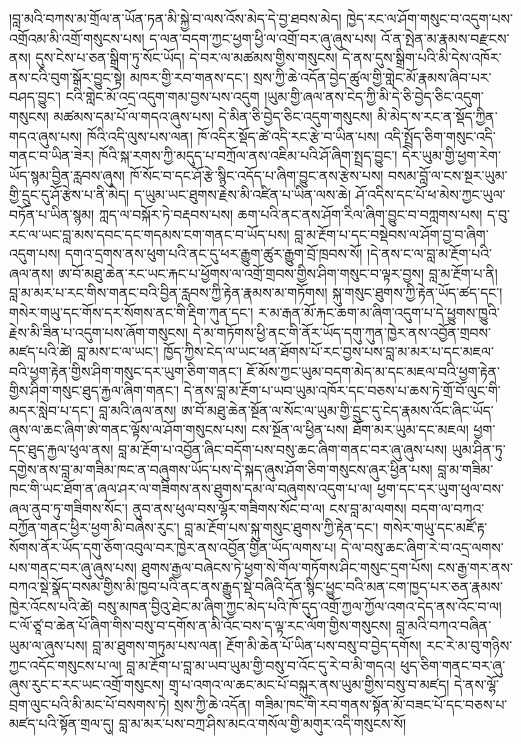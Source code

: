 \documentclass{article}
\begin{document}
།བླ་མའི་བཀས་མ་གྲོལ་ན་ཡོན་ཏན་མི་སྐྱེ་བ་ལས་འོས་མེད་དེ་བྱ་ཐབས་མེད། ཁྱེད་རང་ལ་ཤོག་གསུང་བ་འདུག་པས་འགྲོའམ་མི་འགྲོ་གསུངས་པས། ད་ལན་བདག་ཀྱང་ཕྱག་ཕྱི་ལ་འགྲོ་བར་ཞུ་ཞུས་པས། འོ་ན་སྤེན་མ་རྣམས་བརྫངས་ནས། དུས་ངེས་པ་ཅན་སྒྲིག་ཏུ་སོང་ཡོད། དེ་བར་ལ་མཚམས་གྱིས་གསུངས། དེ་ནས་དུས་སྒྲིག་པའི་མི་དེས་འཁོར་ནས་ངའི་བུག་སྒོར་བྱུང་སྟེ། མཁར་གྱི་རབ་གནས་དང་། སྲས་ཀྱི་ཆེ་འདོན་བྱེད་ཚུལ་གྱི་གླེང་མོ་རྣམས་ཞིབ་པར་བཤད་བྱུང་། ངའི་གླེང་མོ་འདྲ་འདུག་གམ་བྱས་པས་འདུག །ཡུམ་གྱི་ཞལ་ནས་ངེད་ཀྱི་མི་དེ་ཅི་བྱེད་ཅིང་འདུག་གསུངས། མཚམས་དམ་པོ་ལ་གདའ་ཞུས་པས། དེ་མིན་ཅི་བྱེད་ཅིང་འདུག་གསུངས། མི་མེད་ས་རང་ན་སྡོད་ཀྱིན་གདའ་ཞུས་པས། ཁོའི་འདི་ལུས་པས་ལན། ཁོ་འདིར་སྡོད་ཚེ་འདི་རང་རྩེ་བ་ཡིན་པས། འདི་སྤྲོད་ཅིག་གསུང་འདི་གནང་བ་ཡིན་ཟེར། ཁོའི་སྐ་རགས་ཀྱི་མདུད་པ་བཀྲོལ་ནས་འཇིམ་པའི་ཤོ་ཞིག་སྤྲད་བྱུང་། དེར་ཡུམ་གྱི་ཕྱག་རེག་ཡོད་སྙམ་བྱིན་རླབས་ཞུས། ཁོ་སོང་བ་དང་ཤོ་རྩེ་སྙིང་འདོད་པ་ཞིག་བྱུང་ནས་རྩེས་པས། བསམ་བློ་ལ་ངས་སྔར་ཡུམ་གྱི་དྲུང་དུ་ཤོ་རྩེས་པ་ནི་མེད། ད་ཡུམ་ཡང་ཐུགས་རྗེས་མི་འཛིན་པ་ཡིན་ལས་ཆེ། ཤོ་འདིས་དང་པོ་ཕ་མེས་ཀྱང་ཡུལ་བཏོན་པ་ཡིན་སྙམ། ཀླད་ལ་བསྐོར་ཏེ་བརྡབས་པས། ཆག་པའི་ནང་ནས་ཤོག་རིལ་ཞིག་བྱུང་བ་བཀླགས་པས། ད་བུ་རང་ལ་ཡང་བླ་མས་དབང་དང་གདམས་ངག་གནང་བ་ཡོད་པས། བླ་མ་རྔོག་པ་དང་བསྡེབས་ལ་ཤོག་བྱ་བ་ཞིག་འདུག་པས། དགའ་དྲགས་ནས་ཕུག་པའི་ནང་དུ་ཕར་རྒྱུག་ཚུར་རྒྱུག་བྲོ་ཁྲབས་སོ། །དེ་ནས་ང་ལ་བླ་མ་རྔོག་པའི་ཞལ་ནས། ཨ་བོ་མཐུ་ཆེན་རང་ཡང་རྐང་པ་ཕྱོགས་ལ་འགྲོ་གྲབས་གྱིས་ཤིག་གསུང་བ་ལྟར་བྱས། བླ་མ་རྔོག་པ་ནི། བླ་མ་མར་པ་རང་གིས་གནང་བའི་བྱིན་རླབས་ཀྱི་རྟེན་རྣམས་མ་གཏོགས། སྐུ་གསུང་ཐུགས་ཀྱི་རྟེན་ཡོད་ཚད་དང་། གསེར་གཡུ་དང་གོས་དར་སོགས་ནང་གི་རྡིག་ཀུན་དང་། ར་མ་རྒན་མོ་རྐང་ཆག་མ་ཞིག་འདུག་པ་དེ་ཕྱུགས་ཁྱུའི་རྗེས་མི་ཟིན་པ་འདུག་པས་ཞོག་གསུངས། དེ་མ་གཏོགས་ཕྱི་ནང་གི་ནོར་ཡོད་དགུ་ཀུན་ཁྱེར་ནས་འབྱོན་གྲབས་མཛད་པའི་ཚེ། བླ་མས་ང་ལ་ཡང་། ཁྱོད་ཀྱིས་ངེད་ལ་ཡང་ཕན་ཐོགས་པོ་རང་བྱས་པས་བླ་མ་མར་པ་དང་མཇལ་བའི་ཕྱག་རྟེན་གྱིས་ཤིག་གསུང་དར་ཡུག་ཅིག་གནང་། ཇོ་མོས་ཀྱང་ཡུམ་བདག་མེད་མ་དང་མཇལ་བའི་ཕྱག་རྟེན་གྱིས་ཤིག་གསུང་ཐུད་རྐྱལ་ཞིག་གནང་། དེ་ནས་བླ་མ་རྔོག་པ་ཡབ་ཡུམ་འཁོར་དང་བཅས་པ་ཆས་ཏེ་གྲོ་བོ་ལུང་གི་མདར་སླེབ་པ་དང་། བླ་མའི་ཞལ་ནས། ཨ་བོ་མཐུ་ཆེན་སྔོན་ལ་སོང་ལ་ཡུམ་གྱི་དྲུང་དུ་ངེད་རྣམས་འོང་ཞིང་ཡོད་ཞུས་ལ་ཆང་ཞིག་ཨེ་གནང་ལྟོས་ལ་ཤོག་གསུངས་པས། ངས་སྔོན་ལ་ཕྱིན་པས། ཐོག་མར་ཡུམ་དང་མཇལ། ཕྱག་དང་ཐུད་རྐྱལ་ཕུལ་ནས། བླ་མ་རྔོག་པ་འབྱོན་ཞིང་བདོག་པས་བསུ་ཆང་ཞིག་གནང་བར་ཞུ་ཞུས་པས། ཡུམ་ཤིན་ཏུ་དགྱེས་ནས་བླ་མ་གཟིམ་ཁང་ན་བཞུགས་ཡོད་པས་དེ་སྐད་ཞུས་ཤོག་ཅིག་གསུངས་ཞུར་ཕྱིན་པས། བླ་མ་གཟིམ་ཁང་གི་ཡང་ཐོག་ན་ཞལ་ཤར་ལ་གཟིགས་ནས་ཐུགས་དམ་ལ་བཞུགས་འདུག་པ་ལ། ཕྱག་དང་དར་ཡུག་ཕུལ་བས་ཞལ་ནུབ་ཏུ་གཟིགས་སོང་། ནུབ་ནས་ཕུལ་བས་ལྷོར་གཟིགས་སོང་བ་ལ། ངས་བླ་མ་ལགས། བདག་ལ་བཀའ་བཀྱོན་གནང་ཕྱིར་ཕྱག་མི་བཞེས་རུང་། བླ་མ་རྔོག་པས་སྐུ་གསུང་ཐུགས་ཀྱི་རྟེན་དང་། གསེར་གཡུ་དང་མཛོ་རྟ་སོགས་ནོར་ཡོད་དགུ་ཅོག་འབུལ་བར་ཁྱེར་ནས་འབྱོན་གྱིན་ཡོད་ལགས་པ། དེ་ལ་བསུ་ཆང་ཞིག་རེ་བ་འདྲ་ལགས་པས་གནང་བར་ཞུ་ཞུས་པས། ཐུགས་རྒྱལ་བཞེངས་ཏེ་ཕྱག་སེ་གོལ་གཏོགས་ཤིང་གསུང་དྲག་པོས། ངས་རྒྱ་གར་ནས་བཀའ་སྡེ་སྣོད་བསམ་གྱིས་མི་ཁྱབ་པའི་ནང་ནས་རྒྱུད་སྡེ་བཞིའི་དོན་སྙིང་ཕྱུང་བའི་མན་ངག་ཁྱད་པར་ཅན་རྣམས་ཁྱེར་འོངས་པའི་ཚེ། བསུ་མཁན་བྱིའུ་ཐེང་མ་ཞིག་ཀྱང་མེད་པའི་ཁོ་དུད་འགྲོ་ཀྱལ་ཀྱོལ་འགའ་དེད་ནས་འོང་བ་ལ། ང་ལོ་ཙཱ་བ་ཆེན་པོ་ཞིག་གིས་བསུ་བ་དགོས་ན་མི་འོང་བས་ད་ལྟ་རང་ལོག་གྱིས་གསུངས། བླ་མའི་བཀའ་བཞིན་ཡུམ་ལ་ཞུས་པས། བླ་མ་ཐུགས་གཏུམ་པས་ལན། རྔོག་མི་ཆེན་པོ་ཡིན་པས་བསུ་བ་བྱེད་དགོས། རང་རེ་མ་བུ་གཉིས་ཀྱང་འདོང་གསུངས་པ་ལ། བླ་མ་རྔོག་པ་བླ་མ་ཡབ་ཡུམ་གྱི་བསུ་བ་འོང་དུ་རེ་བ་མི་གདའ། ཕུད་ཅིག་གནང་བར་ཞུ་ཞུས་རུང་ང་རང་ཡང་འགྲོ་གསུངས། གྲྭ་པ་འགའ་ལ་ཆང་མང་པོ་བསྐུར་ནས་ཡུམ་གྱིས་བསུ་བ་མཛད། དེ་ནས་ལྷོ་བྲག་ལུང་པའི་མི་མང་པོ་བསགས་ཏེ། སྲས་ཀྱི་ཆེ་འདོན། གཟིམ་ཁང་གི་རབ་གནས་སྟོན་མོ་བཟང་པོ་དང་བཅས་པ་མཛད་པའི་སྟོན་གྲལ་དུ། བླ་མ་མར་པས་བཀྲ་ཤིས་མངའ་གསོལ་གྱི་མགུར་འདི་གསུངས་སོ། 
\end{document}
